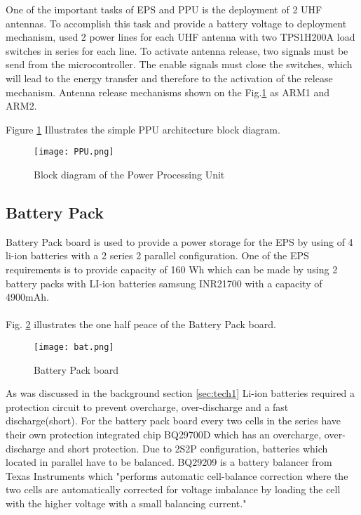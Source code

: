  One of the important tasks of EPS and PPU is the deployment of 2 UHF antennas. To accomplish this task and provide a battery voltage to deployment mechanism, used 2 power lines for each UHF antenna with two TPS1H200A load switches in series for each line. To activate antenna release, two signals must be send from the microcontroller. The enable signals must close the switches, which will lead to the energy transfer and therefore to the activation of the release mechanism. Antenna release mechanisms shown on the Fig.\ref{fig: PPU} as ARM1 and ARM2. 
  
  
  
  Figure \ref{fig: PPU} Illustrates the simple PPU architecture block diagram. 
  
  \begin{figure}[h]
  	\centering
  	\texttt{[image: PPU.png]}
  	\caption{Block diagram of the Power Processing Unit}
  	\label{fig: PPU}
  \end{figure}
  
     \subsection{Battery Pack}
  
 Battery Pack board is used to provide a power storage for the EPS by using of 4 li-ion batteries with a 2 series 2 parallel configuration. One of the EPS requirements is to provide capacity of 160 Wh which can be made by using 2 battery packs with LI-ion batteries samsung INR21700 with a capacity of 4900mAh.\\ \\
 
 Fig. \ref{fig: bat} illustrates the one half peace of the Battery Pack board.
 
 \begin{figure}[h]
 	\centering
 	\texttt{[image: bat.png]}
 	\caption{Battery Pack board}
 	\label{fig: bat}
 \end{figure}
 
  As was discussed in the background section \ref{sec:tech1} Li-ion batteries required a protection circuit to prevent overcharge, over-discharge and a fast discharge(short). For the battery pack board every two cells in the series have their own protection integrated chip BQ29700D which has an overcharge, over-discharge and short protection. Due to 2S2P configuration, batteries which located in parallel have to be balanced. BQ29209 is a battery balancer from Texas Instruments which \cite{23}"performs automatic cell-balance correction where the two cells are automatically corrected for voltage imbalance by loading the cell with the higher voltage with a small balancing current."  
  
